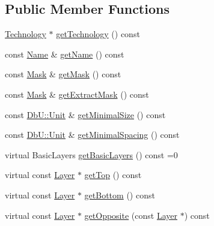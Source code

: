 \subsection*{Public Member Functions}
\begin{DoxyCompactItemize}
\item 
\mbox{\hyperlink{classHurricane_1_1Technology}{Technology}} $\ast$ \mbox{\hyperlink{classHurricane_1_1Layer_ae506b17bd7a245de622f8a8e9947629b}{get\+Technology}} () const
\item 
const \mbox{\hyperlink{classHurricane_1_1Name}{Name}} \& \mbox{\hyperlink{classHurricane_1_1Layer_a3dc54f6efc60fddb8529599caa6b0f1f}{get\+Name}} () const
\item 
const \mbox{\hyperlink{classHurricane_1_1Layer_af5277c670637bd5d910237e7afe01a91}{Mask}} \& \mbox{\hyperlink{classHurricane_1_1Layer_a29b22c3b59cc24bf82449ad6c068ff1f}{get\+Mask}} () const
\item 
const \mbox{\hyperlink{classHurricane_1_1Layer_af5277c670637bd5d910237e7afe01a91}{Mask}} \& \mbox{\hyperlink{classHurricane_1_1Layer_af009bbd89a8e8260122b7244bfa10349}{get\+Extract\+Mask}} () const
\item 
const \mbox{\hyperlink{group__DbUGroup_ga4fbfa3e8c89347af76c9628ea06c4146}{Db\+U\+::\+Unit}} \& \mbox{\hyperlink{classHurricane_1_1Layer_afed9a488bf20daaeed18874f2b16268e}{get\+Minimal\+Size}} () const
\item 
const \mbox{\hyperlink{group__DbUGroup_ga4fbfa3e8c89347af76c9628ea06c4146}{Db\+U\+::\+Unit}} \& \mbox{\hyperlink{classHurricane_1_1Layer_a6a03f9f40ca855d33763497162414062}{get\+Minimal\+Spacing}} () const
\item 
virtual Basic\+Layers \mbox{\hyperlink{classHurricane_1_1Layer_a7e953c126a02952e3a0b0d32f37e2ae0}{get\+Basic\+Layers}} () const =0
\item 
virtual const \mbox{\hyperlink{classHurricane_1_1Layer}{Layer}} $\ast$ \mbox{\hyperlink{classHurricane_1_1Layer_a5f7c43a29f3dd02a9ebccbcbf91d6727}{get\+Top}} () const
\item 
virtual const \mbox{\hyperlink{classHurricane_1_1Layer}{Layer}} $\ast$ \mbox{\hyperlink{classHurricane_1_1Layer_a4dab4552a219d2d900ed0b1245dc6580}{get\+Bottom}} () const
\item 
virtual const \mbox{\hyperlink{classHurricane_1_1Layer}{Layer}} $\ast$ \mbox{\hyperlink{classHurricane_1_1Layer_a69e76c09a56260169c4f5c145a35a47f}{get\+Opposite}} (const \mbox{\hyperlink{classHurricane_1_1Layer}{Layer}} $\ast$) const
\item 

\end{DoxyCompactItemize}
